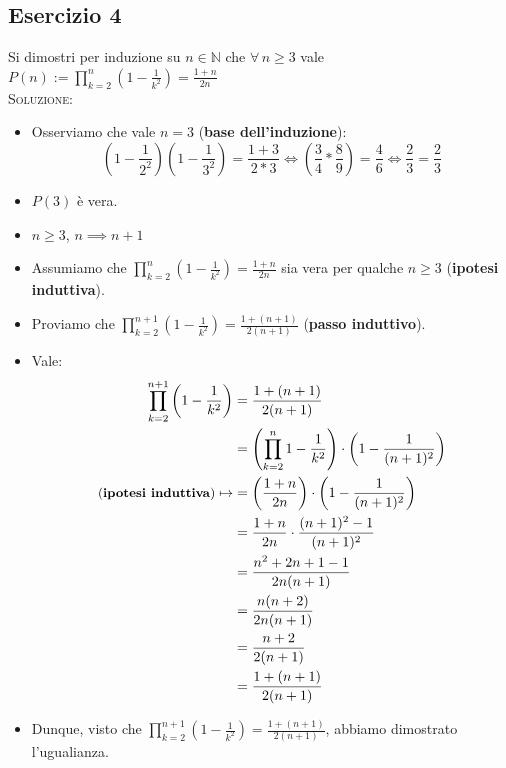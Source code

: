 \documentclass[10pt]{article}
\begin{document}
	\subsection{Esercizio 4}
	Si dimostri per induzione su $n \!\in\! \mathbb{N}$ che $\forall \, n \geq 3$ vale $P(n) := \displaystyle{\prod_{k=2}^n \left(1-\frac{1}{k^2}\right) = \frac{1+n}{2n}}$
	\\ \textsc{Soluzione:}
	\begin{itemize}
	\item
	Osserviamo che vale $n=3$ (\textbf{base dell'induzione}):
	$$\left(1-\frac{1}{2^2}\right)\left(1-\frac{1}{3^2}\right) = \frac{1+3}{2*3} \Longleftrightarrow \left(\frac{3}{4} * \frac{8}{9} \right) = \frac{4}{6} \Longleftrightarrow \frac{2}{3} = \frac{2}{3}$$
	\item
	$P(3)$ è vera.
	\item
	$n \!\geq\! 3$, $n \implies n+1$
	\item
	Assumiamo che $\displaystyle{\prod_{k=2}^n \left(1-\frac{1}{k^2}\right) = \frac{1+n}{2n}}$ sia vera per qualche $n \geq 3$ (\textbf{ipotesi induttiva}).
	\item
	Proviamo che $\displaystyle{\prod_{k=2}^{n+1} \left(1-\frac{1}{k^2}\right) = \frac{1+(n+1)}{2(n+1)}}$ (\textbf{passo induttivo}).
	\item
	Vale:
	\begin{equation}
	\begin{split}
	\prod_{k=2}^{n+1} \left(1-\frac{1}{k^2}\right) &= \frac{1+(n+1)}{2(n+1)} \\
	&= \left(\prod_{k=2}^n 1-\frac{1}{k^2}\right) \cdot \left( 1-\frac{1}{(n+1)^2} \right) \\
	\textrm{\small{(\textbf{ipotesi induttiva})}} \mapsto &= \left( \frac{1+n}{2n} \right) \cdot \left(1 - \frac{1}{(n+1)^2}  \right) \\
	&= \frac{1+n}{2n} \cdot \frac{(n+1)^2 - 1}{(n+1)^2} \\
	&= \frac{n^2 + 2n + 1 -1}{2n(n+1)} \\
	&= \frac{n(n+2)}{2n(n+1)} \\
	&= \frac{n+2}{2(n+1)} \\
	&= \frac{1 + (n+1)}{2(n+1)}
	\notag
	\end{split}
	\end{equation}
	\item
	Dunque, visto che $\displaystyle{\prod_{k=2}^{n+1} \left(1-\frac{1}{k^2}\right) = \frac{1 + (n+1)}{2(n+1)}}$, abbiamo dimostrato l'ugualianza.
	\end{itemize}
	
\end{document}
